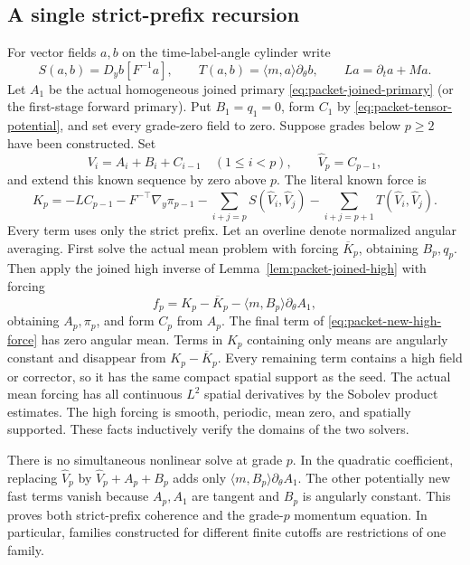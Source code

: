 \subsection{A single strict-prefix recursion}
For vector fields $a,b$ on the time-label-angle cylinder write
\[
 S(a,b)=D_yb[F^{-1}a],\qquad
 T(a,b)=\langle m,a\rangle\partial_\theta b,\qquad
 L a=\partial_ta+Ma.
\]
Let $A_1$ be the actual homogeneous joined primary
\eqref{eq:packet-joined-primary} (or the first-stage forward primary). Put $B_1=q_1=0$, form $C_1$ by
\eqref{eq:packet-tensor-potential}, and set every grade-zero field to zero.
Suppose grades below $p\ge2$ have been constructed. Set
\[
 V_i=A_i+B_i+C_{i-1}\quad(1\le i<p),\qquad
 \widehat V_p=C_{p-1},
\]
and extend this known sequence by zero above $p$. The literal known force is
\begin{equation}\label{eq:packet-known-force}
 K_p=-LC_{p-1}-F^{-\top}\nabla_y\pi_{p-1}
       -\sum_{i+j=p}S(\widehat V_i,\widehat V_j)
       -\sum_{i+j=p+1}T(\widehat V_i,\widehat V_j).
\end{equation}
Every term uses only the strict prefix. Let an overline denote normalized
angular averaging. First solve the actual mean problem with forcing
$\overline K_p$, obtaining $B_p,q_p$. Then apply the joined high
inverse of Lemma~\ref{lem:packet-joined-high} with forcing
\begin{equation}\label{eq:packet-new-high-force}
 f_p=K_p-\overline K_p-\langle m,B_p\rangle\partial_\theta A_1,
\end{equation}
obtaining $A_p,\pi_p$, and form $C_p$ from $A_p$.
The final term of \eqref{eq:packet-new-high-force} has zero angular mean.
Terms in $K_p$ containing only means are angularly constant and disappear
from $K_p-\overline K_p$. Every remaining term contains a high field or
corrector, so it has the same compact spatial support as the seed. The
actual mean forcing has all continuous $L^2$ spatial derivatives by the
Sobolev product estimates. The high forcing is smooth, periodic, mean
zero, and spatially supported. These facts inductively verify the domains
of the two solvers.

There is no simultaneous nonlinear solve at grade $p$. In the quadratic
coefficient, replacing $\widehat V_p$ by
$\widehat V_p+A_p+B_p$ adds only
$\langle m,B_p\rangle\partial_\theta A_1$.
The other potentially new fast terms vanish because $A_p,A_1$ are
tangent and $B_p$ is angularly constant. This proves both strict-prefix
coherence and the grade-$p$ momentum equation. In particular, families
constructed for different finite cutoffs are restrictions of one family.

